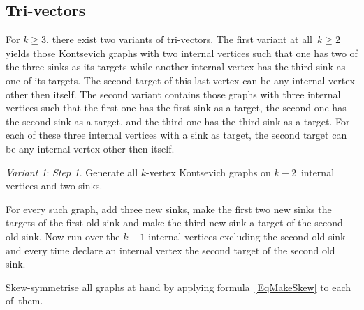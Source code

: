\documentclass[a4paper]{jpconf}%
\theoremstyle{definition}
\theoremstyle{remark}
\begin{document}
\subsection{\textbf{Tri\/-\/vectors}}
For $k\geqslant 3$, there exist two variants of tri\/-\/vectors. The first variant
at all~$k\geqslant2$ yields those Kontsevich graphs with two internal vertices such that one has 
two of the three sinks as its targets 
while another internal vertex has the third sink as one of its targets. 
The second target of this last vertex can be any internal vertex other then itself.
The second variant contains those graphs with three internal vertices such that
the first one has the first sink as a target, the second one has the second 
sink as a target, and the third one has the third sink as a target. 
For each of these three internal vertices with a sink as target, 
the second target can be any internal vertex other then itself.

\smallskip\noindent%
{\textit{Variant 1}: \textit{Step 1.}} Generate all 
$k$-vertex Kontsevich graphs on $k-2$~internal vertices and two sinks.

{} For every such graph,
add three new sinks, make the first two new sinks the targets of the 
first old sink and make the third new sink a target of the second old sink.
Now run over the $k-1$ internal vertices excluding the second old sink and 
every time declare an internal vertex the second target of the second old sink.

{}
Skew\/-\/symmetrise all %
graphs at hand by applying formula~\eqref{EqMakeSkew} to each of~them.
\end{document}

